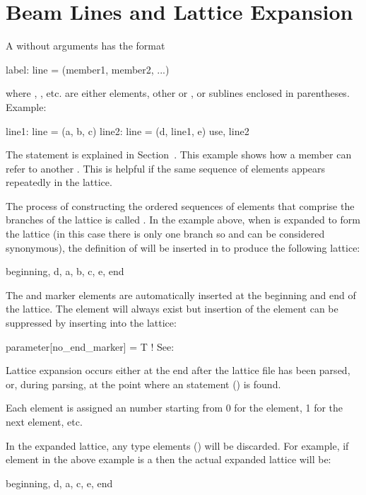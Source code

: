 \section{Beam Lines and Lattice Expansion}
\label{s:lines.wo.arg}

A  without arguments has the format
\begin{example}
  label: line = (member1, member2, ...)
\end{example}
where , , etc. are either elements, other  or , or sublines enclosed in parentheses.  Example:
\begin{example}
  line1: line = (a, b, c)
  line2: line = (d, line1, e)
  use, line2
\end{example}
The  statement is explained in Section~.  This example shows how a  member can refer to another . This is helpful if the same sequence of elements
appears repeatedly in the lattice.

The process of constructing the ordered sequences of elements that comprise the branches of the
lattice is called . In the example above, when  is expanded to form
the lattice (in this case there is only one branch so  and  can be considered
synonymous), the definition of  will be inserted in to produce the following lattice:
\begin{example}
  beginning, d, a, b, c, e, end
\end{example}
The  and  marker elements are automatically inserted at the beginning and end
of the lattice. The  element will always exist but insertion of the  element
can be suppressed by inserting into the lattice:
\begin{example}
 parameter[no_end_marker] = T    ! See: 
\end{example}
Lattice expansion occurs either at the end after the lattice file has been parsed, or, during parsing, at the
point where an  statement () is found.

Each element is assigned an  number starting from 0 for the 
element, 1 for the next element, etc.

In the expanded lattice, any  type elements () will be discarded. For
example, if element  in the above example is a  then the actual expanded lattice
will be:
\begin{example}
  beginning, d, a, c, e, end
\end{example}


